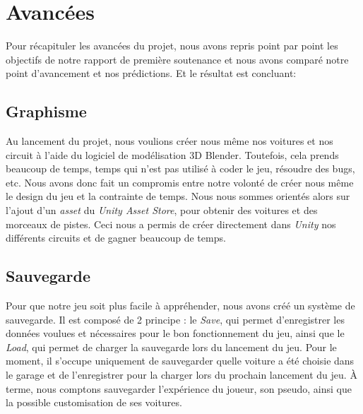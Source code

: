 \documentclass[12pt,a4paper]{article}
\begin{document}
    \section{Avancées}
        Pour récapituler les avancées du projet, nous avons repris point par point les objectifs de 
        notre rapport de première soutenance et nous avons comparé notre point d'avancement et nos 
        prédictions. Et le résultat est concluant:

        \subsection{Graphisme}
            Au lancement du projet, nous voulions créer nous même nos voitures et nos circuit à 
            l'aide du logiciel de modélisation 3D Blender. Toutefois, cela prends beaucoup de temps,
            temps qui n'est pas utilisé à coder le jeu, résoudre des bugs, etc. Nous avons donc fait
            un compromis entre notre volonté de créer nous même le design du jeu et la contrainte de
            temps. Nous nous sommes orientés alors sur l'ajout d'un \textit{asset} du \textsl{Unity
            Asset Store}, pour obtenir des voitures et des morceaux de pistes. Ceci nous a permis de
            créer directement dans \textsl{Unity} nos différents circuits et de gagner beaucoup de 
            temps. 
        
        \subsection{Sauvegarde}
            Pour que notre jeu soit plus facile à appréhender, nous avons créé un système de 
            sauvegarde. Il est composé de 2 principe : le \textsl{Save}, qui permet d'enregistrer 
            les données voulues et nécessaires pour le bon fonctionnement du jeu, ainsi que le 
            \textsl{Load}, qui permet de charger la sauvegarde lors du lancement du jeu. Pour le 
            moment, il s'occupe uniquement de sauvegarder quelle voiture a été choisie dans le 
            garage et de l'enregistrer pour la charger lors du prochain lancement du jeu. À terme, 
            nous comptons sauvegarder l'expérience du joueur, son pseudo, ainsi que la possible 
            customisation de ses voitures.
\end{document}
